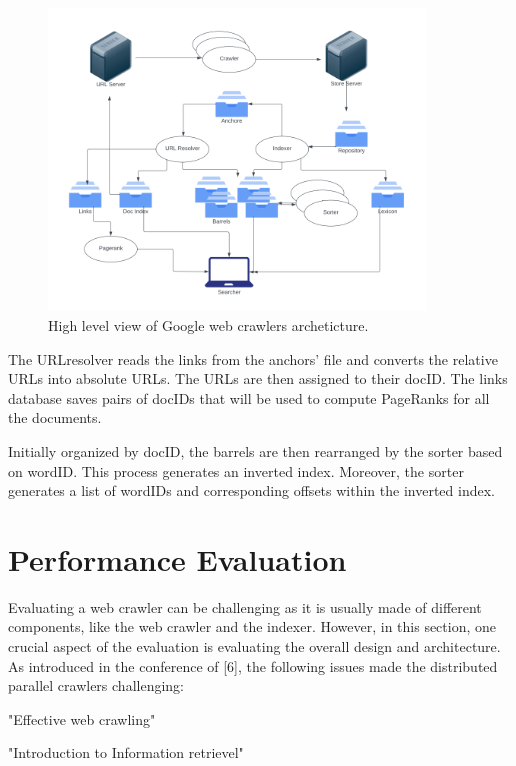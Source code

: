 \begin{figure}[h]	
     \centering
     \includegraphics[width=10cm]{images/google_arch.png}
     \caption{High level view of Google web crawlers archeticture.}
     \label{fig:google-arch}
\end{figure}

The URLresolver reads the links from the anchors' file and converts the relative URLs into absolute URLs. The URLs are then assigned to their docID. The links database saves pairs of docIDs that will be used to compute PageRanks for all the documents. 

Initially organized by docID, the barrels are then rearranged by the sorter based on wordID. This process generates an inverted index. Moreover, the sorter generates a list of wordIDs and corresponding offsets within the inverted index. 


\section{Performance Evaluation}
Evaluating a web crawler can be challenging as it is usually made of different components, like the web crawler and the indexer. However, in this section, one crucial aspect of the evaluation is evaluating the overall design and architecture. As introduced in the conference of [6], the following issues made the distributed parallel crawlers challenging:   

"Effective web crawling"

"Introduction to Information retrievel"
